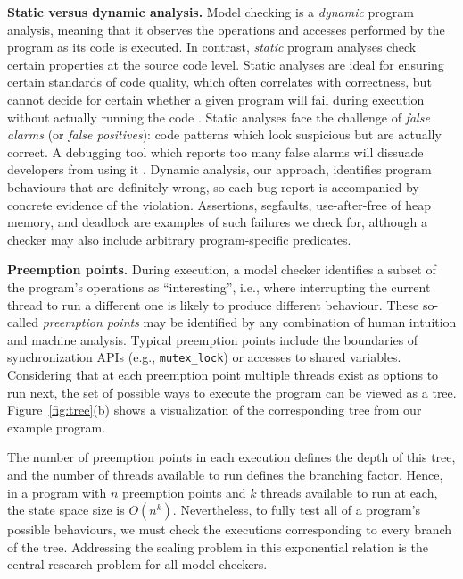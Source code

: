 {\bf Static versus dynamic analysis.}
Model checking is a {\em dynamic} program analysis, meaning that it observes the operations and accesses performed by the program as its code is executed.
In contrast, {\em static} program analyses check certain properties at the source code level.
Static analyses are ideal for ensuring certain standards of code quality, which often correlates with correctness,
but cannot decide for certain whether a given program will fail during execution without actually running the code \cite{incompleteness}.
Static analyses face the challenge of {\em false alarms} (or {\em false positives}):
code patterns which look suspicious but are actually correct.
A debugging tool which reports too many false alarms will dissuade developers from using it \cite{racerx}.
Dynamic analysis, our approach, identifies program behaviours that are definitely wrong,
so each bug report is accompanied by concrete evidence of the violation.
Assertions, segfaults, use-after-free of heap memory, and deadlock are examples of such failures we check for,
although a checker may also include arbitrary program-specific predicates.

{\bf Preemption points.}
During execution, a model checker identifies a subset of the program's operations as ``interesting'', i.e.,
where interrupting the current thread to run a different one is likely to produce different behaviour.
These so-called {\em preemption points} may be identified by any combination of human intuition and machine analysis.
Typical preemption points include the boundaries of synchronization APIs (e.g., {\tt mutex\_lock}) or accesses to shared variables.
Considering that at each preemption point multiple threads exist as options to run next,
the set of possible ways to execute the program can be viewed as a tree.
Figure~\ref{fig:tree}(b) shows a visualization of the corresponding tree from our example program.

The number of preemption points in each execution defines the depth of this tree,
and the number of threads available to run defines the branching factor.
Hence, in a program with $n$ preemption points and $k$ threads available to run at each, the state space size is $O(n^k)$.
Nevertheless, to fully test all of a program's possible behaviours, we must check the executions corresponding to every branch of the tree.
Addressing the scaling problem in this exponential relation is the central research problem for all model checkers.

